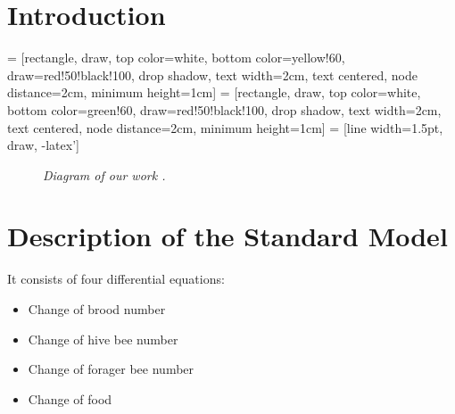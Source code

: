 \documentclass[
	paper=128mm:96mm,
	fontsize=11pt,
	pagesize,
	parskip=half-,
]{scrartcl}
\theoremstyle{mythmstyle} %
\begin{document}
\section{Introduction}
	 = [rectangle, draw, top color=white, bottom color=yellow!60, draw=red!50!black!100, drop shadow, text width=2cm, text centered, node distance=2cm, minimum height=1cm]
	 = [rectangle, draw, top color=white, bottom color=green!60, draw=red!50!black!100, drop shadow, text width=2cm, text centered, node distance=2cm, minimum height=1cm]
	 = [line width=1.5pt, draw, -latex']
	\begin{figure}[h]
		\centering
	
	\caption{\textit{Diagram of our work \cite{khoury13} \cite{seeley95}.}}
		\label{fig:workDiagram}
	\end{figure}
	\clearpage
\section{Description of the Standard Model}
	It consists of four differential equations:
	\begin{itemize}
		\item Change of brood number
		\item Change of hive bee number
		\item Change of forager bee number
		\item Change of food
	\end{itemize}
	\clearpage
\end{document}
